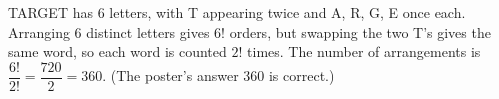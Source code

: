 TARGET has $6$ letters, with T appearing twice and A, R, G, E once each. Arranging $6$ distinct letters gives $6!$ orders, but swapping the two T's gives the same word, so each word is counted $2!$ times. The number of arrangements is $\dfrac{6!}{2!}=\dfrac{720}{2}=\boxed{360}$. (The poster's answer $360$ is correct.)
